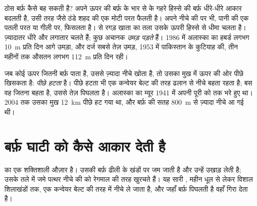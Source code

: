 ठोस बर्फ़ कैसे बह सकती है? अपने ऊपर की बर्फ़ के भार से  के गहरे हिस्से की बर्फ़
धीरे-धीरे आकार बदलती है, उसी तरह जैसे ठंडे शहद की एक मोटी परत फैलती है।  अपने नीचे
की  पर भी, पानी की एक पतली परत या गीली  पर, फिसलता है।  से रगड़ खाता
 का तला उसके ऊपरी हिस्से से धीमा चलता है। ज़्यादातर  धीरे और लगातार चलते हैं;
कुछ अचानक \emph{उमड़ पड़ते} हैं। 1986 में अलास्का का हबर्ड  लगभग \qty{10}{m}
प्रति दिन आगे उमड़ा, और दर्ज सबसे तेज़ उमड़, 1953 में पाकिस्तान के कुटियाह  की, तीन
महीनों तक औसतन लगभग \qty{112}{m} प्रति दिन
रही।

जब कोई  ऊपर जितनी बर्फ़ पाता है, उससे ज़्यादा नीचे खोता है, तो उसका मुख  में ऊपर
की ओर पीछे खिसकता है:  \emph{पीछे हटता} है। पीछे हटता  भी एक कन्वेयर बेल्ट
की तरह ढलान से नीचे बहता रहता है; बस वह जितना बहता है, उससे तेज़ पिघलता है। अलास्का का
म्यूर  1941 में अपनी पूरी  को  तक भरे हुए था। 2004 तक उसका मुख
\qty{12}{km} पीछे हट गया था, और बर्फ़ की सतह \qty{800}{m} से ज़्यादा नीचे आ गई
थी।

\section{बर्फ़ घाटी को कैसे आकार देती है}

  का एक शक्तिशाली औज़ार है। उसकी बर्फ़ ढीली  के खंडों पर जम जाती है और
उन्हें उखाड़ लेती है; उसके तले में जमे पत्थर नीचे की  को रेगमाल की तरह खुरचते हैं।
 यह सारी , महीन धूल से लेकर विशाल शिलाखंडों तक, एक कन्वेयर बेल्ट की तरह 
में नीचे ले जाता है, और जहाँ बर्फ़ पिघलती है वहाँ गिरा देता
है।

